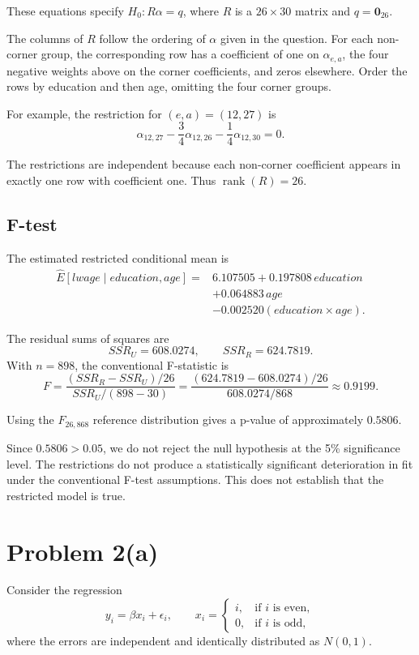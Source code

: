 \documentclass[11pt]{article}
\begin{document}
These equations specify $H_0:R\alpha=q$, where
$R$ is a $26\times30$ matrix and
$q=\mathbf{0}_{26}$.

The columns of $R$ follow the ordering of $\alpha$
given in the question. For each non-corner group,
the corresponding row has a coefficient of one
on $\alpha_{e,a}$, the four negative weights above
on the corner coefficients, and zeros elsewhere.
Order the rows by education and then age,
omitting the four corner groups.

For example, the restriction for $(e,a)=(12,27)$ is
\[
\alpha_{12,27}
-\frac34\alpha_{12,26}
-\frac14\alpha_{12,30}=0.
\]

The restrictions are independent because each
non-corner coefficient appears in exactly one row
with coefficient one. Thus $\operatorname{rank}(R)=26$.

\subsection*{F-test}

The estimated restricted conditional mean is
\[
\begin{aligned}
\widehat{E}[lwage\mid education,age]
={}&6.107505+0.197808\,education\\
&+0.064883\,age\\
&-0.002520(education\times age).
\end{aligned}
\]

The residual sums of squares are
\[
SSR_U=608.0274,
\qquad
SSR_R=624.7819.
\]
With $n=898$, the conventional F-statistic is
\[
F
=\frac{(SSR_R-SSR_U)/26}{SSR_U/(898-30)}
=\frac{(624.7819-608.0274)/26}{608.0274/868}
\approx0.9199.
\]

Using the $F_{26,868}$ reference distribution gives
a p-value of approximately $0.5806$.

Since $0.5806>0.05$, we do not reject the null
hypothesis at the 5\% significance level.
The restrictions do not produce a statistically
significant deterioration in fit under the
conventional F-test assumptions. This does not
establish that the restricted model is true.
\clearpage
\section*{Problem 2(a)}

Consider the regression
\[
y_i=\beta x_i+\epsilon_i,
\qquad
x_i=
\begin{cases}
i, & \text{if } i \text{ is even},\\
0, & \text{if } i \text{ is odd},
\end{cases}
\]
where the errors are independent and identically
distributed as $N(0,1)$.
\end{document}
